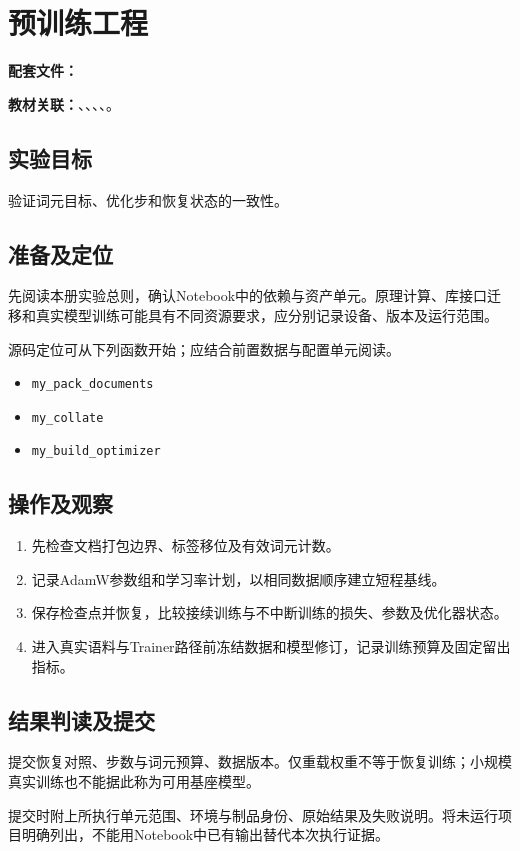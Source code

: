 \chapter{预训练工程}
\label{lab:40_pre_training}

\noindent\textbf{配套文件：}\par
\noindent\textbf{教材关联：}、、、、。

\section*{实验目标}
验证词元目标、优化步和恢复状态的一致性。

\section*{准备及定位}
先阅读本册实验总则，确认Notebook中的依赖与资产单元。原理计算、库接口迁移和真实模型训练可能具有不同资源要求，应分别记录设备、版本及运行范围。

源码定位可从下列函数开始；应结合前置数据与配置单元阅读。
\begin{itemize}
\item \texttt{my\_pack\_documents}
\item \texttt{my\_collate}
\item \texttt{my\_build\_optimizer}
\end{itemize}

\section*{操作及观察}
\begin{enumerate}
\item 先检查文档打包边界、标签移位及有效词元计数。
\item 记录AdamW参数组和学习率计划，以相同数据顺序建立短程基线。
\item 保存检查点并恢复，比较接续训练与不中断训练的损失、参数及优化器状态。
\item 进入真实语料与Trainer路径前冻结数据和模型修订，记录训练预算及固定留出指标。
\end{enumerate}

\section*{结果判读及提交}
提交恢复对照、步数与词元预算、数据版本。仅重载权重不等于恢复训练；小规模真实训练也不能据此称为可用基座模型。

提交时附上所执行单元范围、环境与制品身份、原始结果及失败说明。将未运行项目明确列出，不能用Notebook中已有输出替代本次执行证据。
